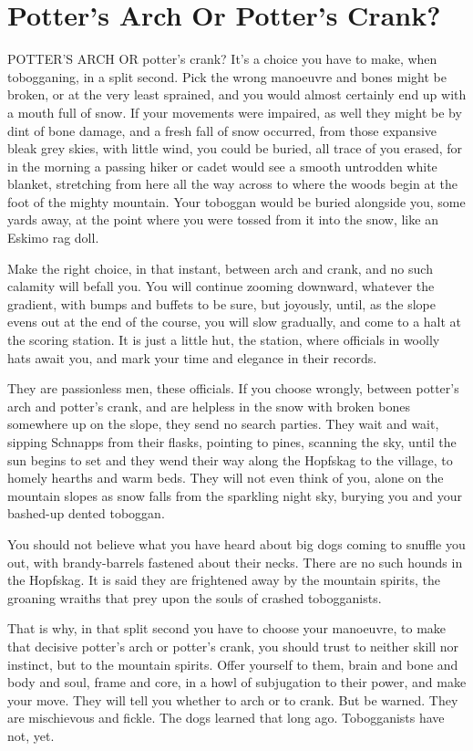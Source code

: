 \chapter{Potter's Arch Or Potter's Crank?}

POTTER'S ARCH OR potter's crank? It's a choice you have to make, when tobogganing, in a split second. Pick the wrong manoeuvre and bones might be broken, or at the very least sprained, and you would almost certainly end up with a mouth full of snow. If your movements were impaired, as well they might be by dint of bone damage, and a fresh fall of snow occurred, from those expansive bleak grey skies, with little wind, you could be buried, all trace of you erased, for in the morning a passing hiker or cadet would see a smooth untrodden white blanket, stretching from here all the way across to where the woods begin at the foot of the mighty mountain. Your toboggan would be buried alongside you, some yards away, at the point where you were tossed from it into the snow, like an Eskimo rag doll.

Make the right choice, in that instant, between arch and crank, and no such calamity will befall you. You will continue zooming downward, whatever the gradient, with bumps and buffets to be sure, but joyously, until, as the slope evens out at the end of the course, you will slow gradually, and come to a halt at the scoring station. It is just a little hut, the station, where officials in woolly hats await you, and mark your time and elegance in their records.

They are passionless men, these officials. If you choose wrongly, between potter's arch and potter's crank, and are helpless in the snow with broken bones somewhere up on the slope, they send no search parties. They wait and wait, sipping Schnapps from their flasks, pointing to pines, scanning the sky, until the sun begins to set and they wend their way along the Hopfskag to the village, to homely hearths and warm beds. They will not even think of you, alone on the mountain slopes as snow falls from the sparkling night sky, burying you and your bashed-up dented toboggan.

You should not believe what you have heard about big dogs coming to snuffle you out, with brandy-barrels fastened about their necks. There are no such hounds in the Hopfskag. It is said they are frightened away by the mountain spirits, the groaning wraiths that prey upon the souls of crashed tobogganists.

That is why, in that split second you have to choose your manoeuvre, to make that decisive potter's arch or potter's crank, you should trust to neither skill nor instinct, but to the mountain spirits. Offer yourself to them, brain and bone and body and soul, frame and core, in a howl of subjugation to their power, and make your move. They will tell you whether to arch or to crank. But be warned. They are mischievous and fickle. The dogs learned that long ago. Tobogganists have not, yet.
